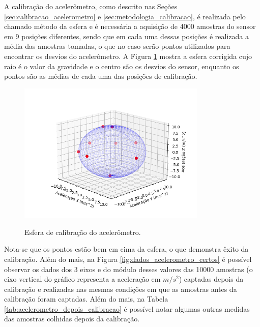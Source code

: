 \documentclass[acronym, symbols, table]{fei}
\begin{document}
	A calibração do acelerômetro, como descrito nas Seções \ref{sec:calibracao_acelerometro} e \ref{sec:metodologia_calibracao}, é realizada pelo chamado método da esfera e é necessária a aquisição de 4000 amostras do sensor em 9 posições diferentes, sendo que em cada uma dessas posições é realizada a média das amostras tomadas, o que no caso serão pontos utilizados para encontrar os desvios do acelerômetro. A Figura \ref{fig:dados_esfera_certo} mostra a esfera corrigida cujo raio é o valor da gravidade e o centro são os desvios do sensor, enquanto os pontos são as médias de cada uma das posições de calibração.
	
	\begin{figure}[!htb]
		\centering
		\caption{Esfera de calibração do acelerômetro.}
		\includegraphics[width=0.8\textwidth]{dados_esfera_correto.png}
		\label{fig:dados_esfera_certo}
	\end{figure}
	
	Nota-se que os pontos estão bem em cima da esfera, o que demonstra êxito da calibração. Além do mais, na Figura \ref{fig:dados_acelerometro_certos} é possível observar os dados dos 3 eixos e do módulo desses valores das 10000 amostras (o eixo vertical do gráfico representa a aceleração em $m/s^2$) captadas depois da calibração e realizadas nas mesmas condições em que as amostras antes da calibração foram captadas. Além do mais, na Tabela \ref{tab:acelerometro_depois_calibracao} é possível notar algumas outras medidas das amostras colhidas depois da calibração.
	
\end{document}
